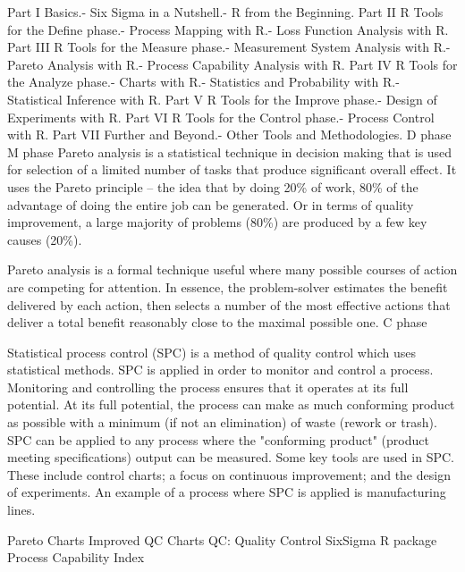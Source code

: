 
Part I Basics.- Six Sigma in a Nutshell.- R from the Beginning.
Part II R Tools for the Define phase.- Process Mapping with R.- Loss Function Analysis with R.
Part III R Tools for the Measure phase.- Measurement System Analysis with R.- Pareto Analysis with R.- Process Capability Analysis with R.
Part IV R Tools for the Analyze phase.- Charts with R.- Statistics and Probability with R.- Statistical Inference with R.
Part V R Tools for the Improve phase.- Design of Experiments with R.
Part VI R Tools for the Control phase.- Process Control with R.
Part VII Further and Beyond.- Other Tools and Methodologies.
D phase
M phase
Pareto analysis is a statistical technique in decision making that is used for selection of a limited number of tasks that
produce significant overall effect. It uses the Pareto principle – the idea that by doing 20\% of work, 80\% of the advantage
of doing the entire job can be generated.  Or in terms of quality improvement, a large majority of problems (80\%) are produced by a few key causes (20\%).
 
Pareto analysis is a formal technique useful where many possible courses of action are competing for attention.
In essence, the problem-solver estimates the benefit delivered by each action, then selects a number of the most
effective actions that deliver a total benefit reasonably close to the maximal possible one.
C phase

Statistical process control (SPC) is a method of quality control which uses statistical methods. SPC is applied in order to monitor and control a process. Monitoring and controlling the process ensures that it operates at its full potential. At its full potential, the process can make as much conforming product as possible with a minimum (if not an elimination) of waste (rework or trash). SPC can be applied to any process where the "conforming product" (product meeting specifications) output can be measured. Some key tools are used in SPC. These include control charts; a focus on continuous improvement; and the design of experiments.
An example of a process where SPC is applied is manufacturing lines.


Pareto Charts
Improved QC Charts
QC: Quality Control
SixSigma R package
Process Capability Index

